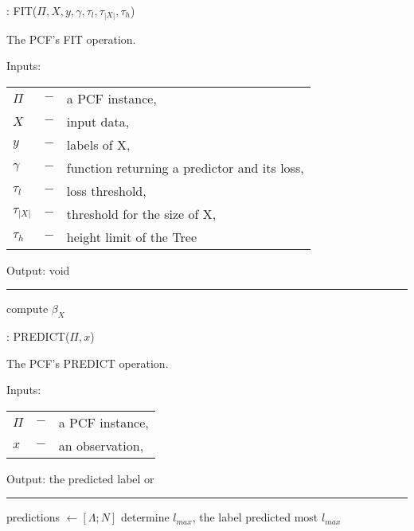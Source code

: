 \documentclass[journal]{IEEEtran}
\begin{document}
\begin{algorithm}
  \caption{: FIT($\Pi, X, y, \gamma, \tau_{l},
    \tau_{|X|}, \tau_{h}$)}%
  \label{alg:pcf_fit}
  The PCF's FIT operation.

  Inputs:

    \begin{tabu}{llX}
    $\Pi$ &$-$ &a PCF instance,\\
    $X$ &$-$ &input data,\\
    $y$ &$-$ &labels of X,\\
    $\gamma$ &$-$ &function returning a predictor and its
      loss,\\
    $\tau_{l}$ &$-$ &loss threshold,\\
    $\tau_{|X|}$ &$-$ &threshold for the size of X,\\
    $\tau_{h}$ &$-$ &height limit of the Tree
    \end{tabu}

  Output: void

  \noindent\rule{\linewidth}{0.4pt}

  \begin{algorithmic}[1]
    \STATE compute $\beta_X$
    \ENDFOR
  \end{algorithmic}
\end{algorithm}

\begin{algorithm}
  \caption{: PREDICT($\Pi, x$)}
  \label{alg:pcf_pred}
  The PCF's PREDICT operation.

  Inputs:

    \begin{tabu}{llX}
    $\Pi$ &$-$ &a PCF instance,\\
    $x$ &$-$ &an observation, \\
    \end{tabu}

  Output: the predicted label or \Lambda

  \noindent\rule{\linewidth}{0.4pt}

  \begin{algorithmic}[1]
    \STATE predictions $\leftarrow [\Lambda; N]$
    \ENDFOR
    \STATE determine $l_{max}$, the label predicted most
    \RETURN $l_{max}$
  \end{algorithmic}
\end{algorithm}
\end{document}

